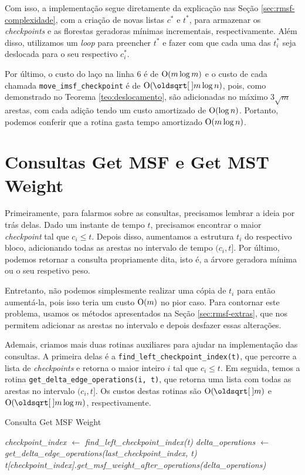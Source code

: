 Com isso, a implementação segue diretamente da explicação nas Seção \ref{sec:rmsf-complexidade}, com a criação de novas listas $c^*$ e $t^*$, para armazenar os \emph{checkpoints} e as florestas geradoras mínimas incrementais, respectivamente. Além disso, utilizamos um \emph{loop} para preencher $t^*$ e fazer com que cada uma das $t^*_i$ seja deslocada para o seu respectivo $c_i^*$.

Por último, o custo do laço na linha 6 é de $\mathrm{O}(m \log m)$ e o custo de cada chamada \texttt{move\_imsf\_checkpoint} é de $\Oh(\sqrt{m} \log n)$, pois, como demonstrado no Teorema \ref{teo:deslocamento}, são adicionadas no máximo $3\sqrt{m}$ arestas, com cada adição tendo um custo amortizado de $\mathrm{O}(\log n)$. Portanto, podemos conferir que a rotina gasta tempo amortizado $\mathrm{O}(m \log n)$.

\section{Consultas Get MSF e Get MST Weight}
\label{sec:rmsf-get-msf}

Primeiramente, para falarmos sobre as consultas, precisamos lembrar a ideia por trás delas. Dado um instante de tempo $t$, precisamos encontrar o maior \emph{checkpoint} tal que $c_i \leq t$. Depois disso, aumentamos a estrutura $t_i$ do respectivo bloco, adicionando todas as arestas no intervalo de tempo $(c_i, t]$. Por último, podemos retornar a consulta propriamente dita, isto é, a árvore geradora mínima ou o seu respetivo peso.

Entretanto, não podemos simplesmente realizar uma cópia de $t_i$ para então aumentá-la, pois isso teria um custo $\mathrm{O}(m)$ no pior caso. Para contornar este problema, usamos os métodos apresentados na Seção \ref{sec:rmsf-extras}, que nos permitem adicionar as arestas no intervalo e depois desfazer essas alterações.

Ademais, criamos mais duas rotinas auxiliares para ajudar na implementação das consultas. A primeira delas é a \texttt{find\_left\_checkpoint\_index(t)}, que percorre a lista de \emph{checkpoints} e retorna o maior inteiro $i$ tal que $c_i \leq t$. Em seguida, temos a rotina \texttt{get\_delta\_edge\_operations(i, t)}, que retorna uma lista com todas as arestas no intervalo $(c_i, t]$. Os custos destas rotinas são $\Oh(\sqrt{m})$ e $\Oh(\sqrt{m}\log{m})$, respectivamente.

\begin{algorithm}[h!]
    \caption{Consulta Get MSF Weight}\label{rmsf-get-msf-weight}
    \begin{algorithmic}[1]
        \State \emph{checkpoint\_index $\gets$ find\_left\_checkpoint\_index(t)}
        \State \emph{delta\_operations $\gets$ get\_delta\_edge\_operations(last\_checkpoint\_index, t)}
        \State \Return \emph{t[checkpoint\_index].get\_msf\_weight\_after\_operations(delta\_operations)}
        \EndFunction
    \end{algorithmic}
\end{algorithm}

